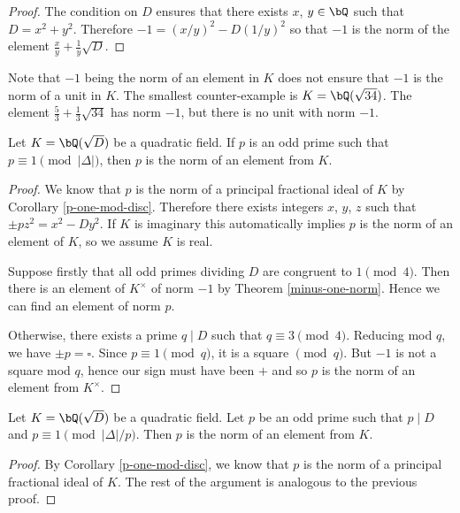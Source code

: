 \begin{proof}
The condition on $D$ ensures that there exists $x$, $y \in \bQ$ such that $D = x^2 + y^2$. Therefore $-1 = (x / y)^2 - D(1/ y)^2$ so that $-1$ is the norm of the element $\frac{x}{y} + \frac{1}{y} \sqrt{D}$.
\end{proof}

Note that $-1$ being the norm of an element in $K$ does not ensure that $-1$ is the norm of a unit in $K$. The smallest counter-example is $K = \bQ(\sqrt{34})$. The element $\frac{5}{3} + \frac{1}{3}\sqrt{34}$ has norm $-1$, but there is no unit with norm $-1$. 

\begin{thm}\label{p-norm-elem-1}
    Let $K = \bQ(\sqrt{D})$ be a quadratic field.  If $p$ is an odd prime such that $p \equiv 1 \pmod {|\Delta|}$, then $p$ is the norm of an element from $K$. 
\end{thm}

\begin{proof}
    We know that $p$ is the norm of a principal fractional ideal of $K$ by Corollary \ref{p-one-mod-disc}. 
    Therefore there exists integers $x$, $y$, $z$ such that $\pm p z^2 = x^2 - Dy^2$. If $K$ is imaginary this automatically implies $p$ is the norm of an element of $K$, so we assume $K$ is real.
    
    Suppose firstly that all odd primes dividing $D$ are congruent to $1 \pmod 4$. Then there is an element of $K^{\times}$ of norm $-1$ by Theorem \ref{minus-one-norm}. Hence we can find an element of norm $p$.

    Otherwise, there exists a prime $q \mid D$ such that $q \equiv 3 \pmod 4$. Reducing mod $q$, we have
    $ \pm p = \square$. Since $p \equiv 1 \pmod q$, it is a square $\pmod q$. But $-1$ is not a square mod $q$, hence our sign must have been $+$ and so $p$ is the norm of an element from $K^{\times}$.
\end{proof}


\begin{thm}\label{p-norm-elem-2}
    Let $K = \bQ(\sqrt{D})$ be a quadratic field. Let $p$ be an odd prime such that $p \mid D$ and $p \equiv 1 \pmod {|\Delta| / p}$. Then $p$ is the norm of an element from $K$. 
\end{thm}

\begin{proof}
    By Corollary \ref{p-one-mod-disc}, we know that $p$ is the norm of a principal fractional ideal of $K$. The rest of the argument is analogous to the previous proof.
\end{proof}  

